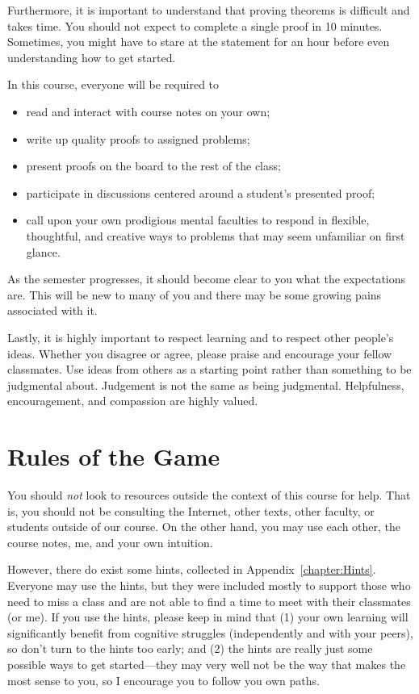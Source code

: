 Furthermore, it is important to understand that proving theorems is difficult and takes time. You should not expect to complete a single proof in 10 minutes. Sometimes, you might have to stare at the statement for an hour before even understanding how to get started. 

In this course, everyone will be required to
\begin{itemize}
\item read and interact with course notes on your own;
\item write up quality proofs to assigned problems;
\item present proofs on the board to the rest of the class;
\item participate in discussions centered around a student's presented proof;
\item call upon your own prodigious mental faculties to respond in flexible, thoughtful, and creative ways to problems that may seem unfamiliar on first glance.
\end{itemize}
\noindent As the semester progresses, it should become clear to you what the expectations are. This will be new to many of you and there may be some growing pains associated with it.

Lastly, it is highly important to respect learning and to respect other people's ideas.  Whether you disagree or agree, please praise and encourage your fellow classmates.  Use ideas from others as a starting point rather than something to be judgmental about.  Judgement is not the same as being judgmental.  Helpfulness, encouragement, and compassion are highly valued.

\section{Rules of the Game}
You should \emph{not} look to resources outside the context of this course for help. That is, you should not be consulting the Internet, other texts, other faculty, or students outside of our course. On the other hand, you may use each other, the course notes, me, and your own intuition.  

However, there do exist some hints, collected in Appendix~\ref{chapter:Hints}. Everyone may use the hints, but they were included mostly to support those who need to miss a class and are not able to find a time to meet with their classmates (or me). If you use the hints, please keep in mind that (1) your own learning will significantly benefit from cognitive struggles (independently and with your peers), so don't turn to the hints too early; and (2) the hints are really just some possible ways to get started---they may very well not be the way that makes the most sense to you, so I encourage you to follow you own paths. 

